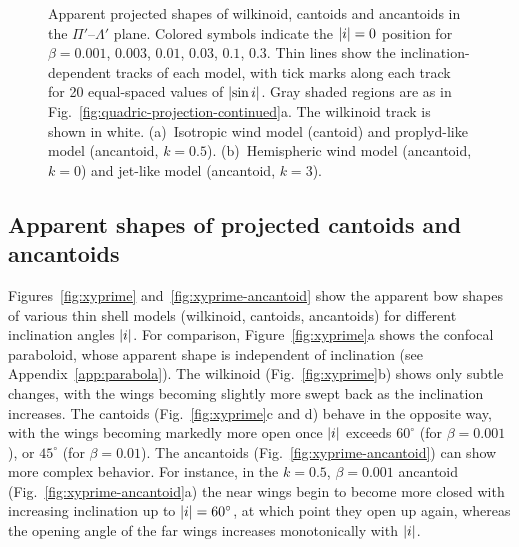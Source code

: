 \begin{figure}
\begin{tabular}{@{}l@{}}
  \end{tabular}
  \caption{Apparent projected shapes of wilkinoid, cantoids and
    ancantoids in the \(\Pi'\)--\(\Lambda'\) plane.  Colored symbols indicate
    the \(\lvert i\rvert = 0\) position for \(\beta = 0.001\), \(0.003\),
    \(0.01\), \(0.03\), \(0.1\), \(0.3\).  Thin lines show the
    inclination-dependent tracks of each model, with tick marks along
    each track for 20 equal-spaced values of \(\lvert\sin i\rvert\).  Gray
    shaded regions are as in
    Fig.~\ref{fig:quadric-projection-continued}a.  The wilkinoid track
    is shown in white. (a)~Isotropic wind model (cantoid) and
    proplyd-like model (ancantoid, \(k = 0.5\)). (b)~Hemispheric wind
    model (ancantoid, \(k = 0\)) and jet-like model (ancantoid,
    \(k = 3\)).}
  \label{fig:thin-shell-R90-Rc}
\end{figure}

\subsection{Apparent shapes of projected cantoids and ancantoids}
\label{sec:proj-shap-cant}

Figures~\ref{fig:xyprime} and~\ref{fig:xyprime-ancantoid} show the
apparent bow shapes of various thin shell models (wilkinoid, cantoids,
ancantoids) for different inclination angles \(\lvert i\rvert\).  For
comparison, Figure~\ref{fig:xyprime}a shows the confocal paraboloid,
whose apparent shape is independent of inclination (see
Appendix~\ref{app:parabola}).  The wilkinoid (Fig.~\ref{fig:xyprime}b)
shows only subtle changes, with the wings becoming slightly more swept
back as the inclination increases.  The cantoids
(Fig.~\ref{fig:xyprime}c and d) behave in the opposite way, with the
wings becoming markedly more open once \(\lvert i\rvert\) exceeds
\(60^\circ\) (for \(\beta = 0.001\)), or \(45^\circ\) (for
\(\beta = 0.01\)).  The ancantoids (Fig.~\ref{fig:xyprime-ancantoid}) can
show more complex behavior.  For instance, in the \(k = 0.5\),
\(\beta = 0.001\) ancantoid (Fig.~\ref{fig:xyprime-ancantoid}a) the near
wings begin to become more closed with increasing inclination up to
\(\lvert i\rvert = 60^\circ\), at which point they open up again, whereas the
opening angle of the far wings increases monotonically with
\(\lvert i\rvert\).

